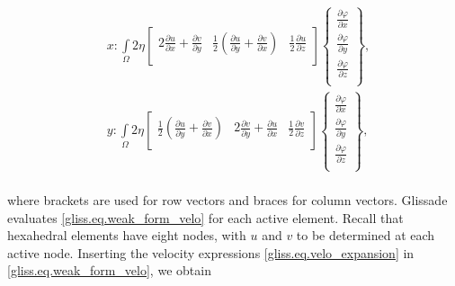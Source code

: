 \begin{equation}
  \label{gliss.eq.weak_form_velo}
  \begin{aligned}
    & x: \int\limits_{\Omega }{2\eta \left[ \begin{matrix}
          2\frac{\partial u}{\partial x}+\frac{\partial v}{\partial y} & \frac{1}{2}\left( \frac{\partial u}{\partial y}+\frac{\partial v}{\partial x} \right) & \frac{1}{2}\frac{\partial u}{\partial z}  \\
\end{matrix} \right]}\left\{ \begin{matrix}
      \frac{\partial \varphi }{\partial x}  \\[6pt]
      \frac{\partial \varphi }{\partial y}  \\[6pt]
      \frac{\partial \varphi }{\partial z}  \\
    \end{matrix} \right\},  \\
    & y: \int\limits_{\Omega }{2\eta \left[ \begin{matrix}
          \frac{1}{2}\left( \frac{\partial u}{\partial y}+\frac{\partial v}{\partial x} \right) & 2\frac{\partial v}{\partial y}+\frac{\partial u}{\partial x} & \frac{1}{2}\frac{\partial v}{\partial z}  \\
        \end{matrix} \right]}\left\{ \begin{matrix}
      \frac{\partial \varphi }{\partial x}  \\[6pt]
      \frac{\partial \varphi }{\partial y}  \\[6pt]
      \frac{\partial \varphi }{\partial z}  \\
    \end{matrix} \right\},  \\
  \end{aligned}
\end{equation}

\noindent
where brackets are used for row vectors and braces for column vectors.
Glissade evaluates \eqref{gliss.eq.weak_form_velo} for each active element.  Recall that hexahedral elements have eight nodes,
with $u$ and $v$ to be determined at each active node.
Inserting the velocity expressions \eqref{gliss.eq.velo_expansion} in \eqref{gliss.eq.weak_form_velo}, we obtain

